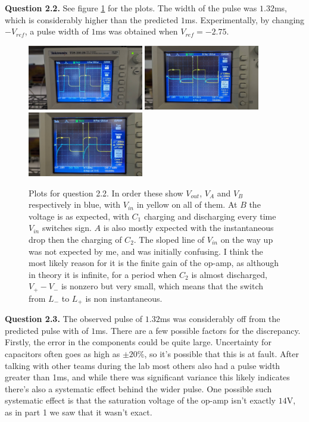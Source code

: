 \documentclass[letterpaper, reqno,11pt]{article}
\begin{document}
{\medskip\noindent\bf Question 2.2.} See figure \ref{fig:2-2} for the plots. The width of the pulse was $1.32$ms, which is considerably higher than the predicted $1$ms. Experimentally, by changing $-V_{ref}$, a pulse width of $1$ms was obtained when $V_{ref}=-2.75$.

\begin{figure}[htpb]
    \centering
    \includegraphics[width=0.45\textwidth]{2-2-Vout}
    \includegraphics[width=0.45\textwidth]{2-2-A}
    \includegraphics[width=0.45\textwidth]{2-2-B}
    \caption{Plots for question 2.2. In order these show $V_{out}$, $V_A$ and $V_B$ respectively in blue, with $V_{in}$ in yellow on all of them. At $B$ the voltage is as expected, with $C_1$ charging and discharging every time $V_{in}$ switches sign. $A$ is also mostly expected with the instantaneous drop then the charging of $C_2$. The sloped line of $V_{in}$ on the way up was not expected by me, and was initially confusing. I think the most likely reason for it is the finite gain of the op-amp, as although in theory it is infinite, for a period when $C_2$ is almost discharged, $V_+-V_-$ is nonzero but very small, which means that the switch from $L_-$ to $L_+$ is non instantaneous.}
    \label{fig:2-2}
\end{figure}

{\medskip\noindent\bf Question 2.3.} The observed pulse of $1.32$ms was considerably off from the predicted pulse with of $1$ms. There are a few possible factors for the discrepancy. Firstly, the error in the components could be quite large. Uncertainty for capacitors often goes as high as $\pm 20\%$, so it's possible that this is at fault. After talking with other teams during the lab most others also had a pulse width greater than 1ms, and while there was significant variance this likely indicates there's also a systematic effect behind the wider pulse. One possible such systematic effect is that the saturation voltage of the op-amp isn't exactly $14$V, as in part 1 we saw that it wasn't exact.
\end{document}
